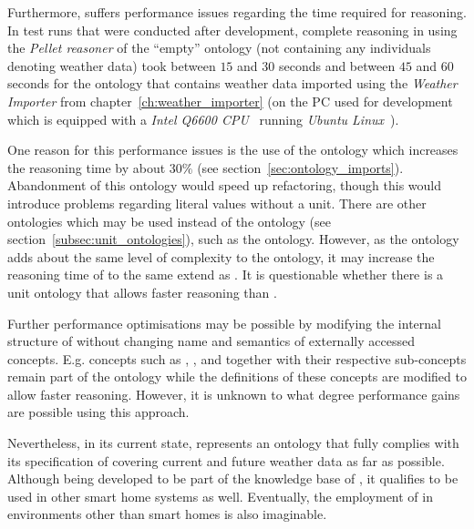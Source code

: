 Furthermore, \smarthomeweather suffers performance issues regarding the time required for reasoning. In test runs that were conducted after development, complete reasoning in \protege using the \emph{Pellet reasoner} of the ``empty'' ontology (not containing any individuals denoting weather data) took between $15$ and $30$ seconds and between $45$ and $60$ seconds for the ontology that contains weather data imported using the \emph{Weather Importer} from chapter~\ref{ch:weather_importer} (on the PC used for development which is equipped with a \emph{Intel Q6600 CPU}~\cite{intel_q6600} running \emph{Ubuntu Linux}~\cite{ubuntu}).

One reason for this performance issues is the use of the \muo ontology which increases the reasoning time by about $30 \%$ (see section~\ref{sec:ontology_imports}). Abandonment of this ontology would speed up refactoring, though this would introduce problems regarding literal values without a unit. There are other ontologies which may be used instead of the \muo ontology (see section~\ref{subsec:unit_ontologies}), such as the  ontology. However, as the  ontology adds about the same level of complexity to the ontology, it may increase the reasoning time of \thinkhome to the same extend as \muo. It is questionable whether there is a unit ontology that allows faster reasoning than \muo.

Further performance optimisations may be possible by modifying the internal structure of \thinkhome without changing name and semantics of externally accessed concepts. E.g. concepts such as , , and  together with their respective sub-concepts remain part of the ontology while the definitions of these concepts are modified to allow faster reasoning. However, it is unknown to what degree performance gains are possible using this approach.

\vspace{1cm}

Nevertheless, in its current state, \smarthomeweather represents an ontology that fully complies with its specification of covering current and future weather data as far as possible. Although being developed to be part of the knowledge base of \thinkhome, it qualifies to be used in other smart home systems as well. Eventually, the employment of \smarthomeweather in environments other than smart homes is also imaginable.
